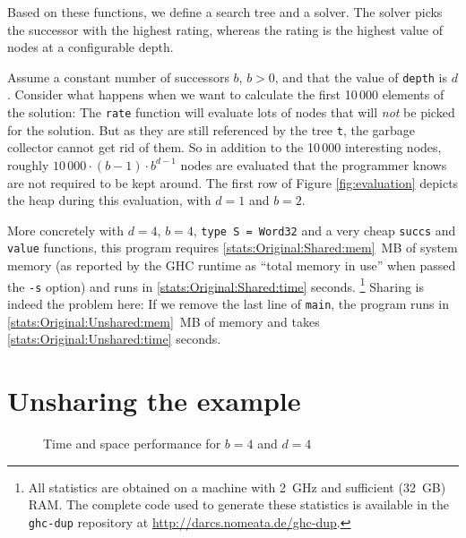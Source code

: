 \documentclass[preprint]{sigplanconf}
\theoremstyle{nonumberplain}
\newcommand{\li}{\lstinline[style=Haskell]}
\newcommand{\ci}{\lstinline[style=Cmm]}
\begin{document}
Based on these functions, we define a search tree and a solver. The solver picks the successor with the highest rating, whereas the rating is the highest value of nodes at a configurable depth.

Assume a constant number of successors $b$, $b>0$, and that the value of \li-depth- is $d$. Consider what happens when we want to calculate the first 10\,000 elements of the solution: The \li-rate- function will evaluate lots of nodes that will \emph{not} be picked for the solution. But as they are still referenced by the tree \li-t-, the garbage collector cannot get rid of them. So in addition to the  10\,000 interesting nodes, roughly $10\,000\cdot (b-1)\cdot b^{d-1}$ nodes are evaluated that the programmer knows are not required to be kept around. The first row of Figure \ref{fig:evaluation} depicts the heap during this evaluation, with $d=1$ and $b=2$.

\newcommand{\stats}[1]{\ref*{#1}}
More concretely with $d=4$, $b=4$, \li-type S = Word32- and a very cheap \li-succs- and \li-value- functions, this program requires \stats{stats:Original:Shared:mem}~MB of system memory (as reported by the GHC runtime as “total memory in use” when passed the \ci!-s! option) and runs in \stats{stats:Original:Shared:time} seconds.%
\footnote{All statistics are obtained on a machine with 2~GHz and sufficient (32~GB) RAM. The complete code used to generate these statistics is available in the \ci!ghc-dup! repository at \url{http://darcs.nomeata.de/ghc-dup}.} Sharing is indeed the problem here: If we remove the last line of \li-main-, the program runs in \stats{stats:Original:Unshared:mem}~MB of memory and takes \stats{stats:Original:Unshared:time} seconds.

\section{Unsharing the example}
\label{sec:unsharing}

\begin{figure*}
\centering

\caption{Time and space performance for $b=4$ and $d=4$}
\label{fig:stats}
\end{figure*}
\end{document}
